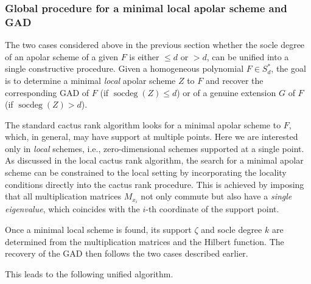 \documentclass[a4paper,11p]{amsart}
\begin{document}

\subsubsection{Global procedure for a minimal local apolar scheme and GAD}\label{Section:GlobalGAD}

The two cases considered above in the previous section whether the socle degree of an apolar scheme of a given $F$ is either $\le d$ or $> d$, can be unified into a single constructive procedure.  
Given a homogeneous polynomial $F \in S_d^*$, the goal is to determine a minimal \emph{local} apolar scheme $Z$ to $F$ and recover the corresponding GAD of $F$ (if $\operatorname{socdeg}(Z) \le d$) or of a genuine extension $G$ of $F$ (if $\operatorname{socdeg}(Z) > d$).

The standard cactus rank algorithm looks for a minimal apolar scheme to $F$, which, in general, may have support at multiple points.  
Here we are interested only in \emph{local} schemes, i.e., zero-dimensional schemes supported at a single point.  
As discussed in the local cactus rank algorithm, the search for a minimal apolar scheme can be constrained to the local setting by incorporating the locality conditions directly into the cactus rank procedure.  
This is achieved by imposing that all multiplication matrices $M_{x_i}$ not only commute but also have a \emph{single eigenvalue}, which coincides with the $i$-th coordinate of the support point.  

Once a minimal local scheme is found, its support $\zeta$ and socle degree $k$ are determined from the multiplication matrices and the Hilbert function.  
The recovery of the GAD then follows the two cases described earlier.

This leads to the following unified algorithm.
\end{document}
